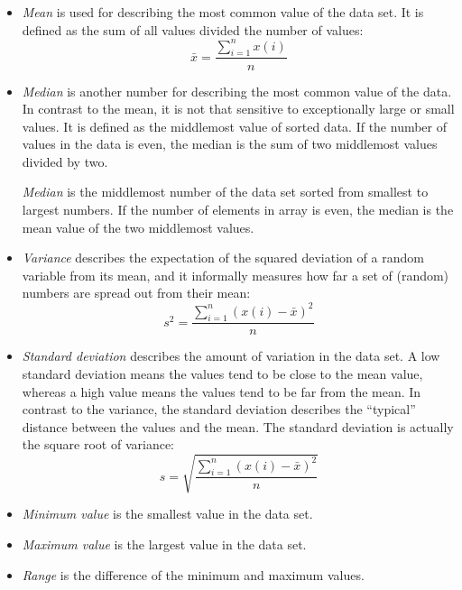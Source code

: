 \documentclass[english,12pt,a4paper,pdftex,elec,utf8]{aaltothesis}
\begin{document}
\begin{itemize}
\item \textit{Mean} is used for describing the most common value of the data set. It is defined as the sum of all values divided the number of values:
\begin{equation} \label{meanequation}
\bar{x} = \frac{\displaystyle \sum\limits^{n}_{i = 1} x(i)}{n}
\end{equation} 

\item \textit{Median} is another number for describing the most common value of the data. In contrast to the mean, it is not that sensitive to exceptionally large or small values. It is defined as the middlemost value of sorted data. If the number of values in the data is even, the median is the sum of two middlemost values divided by two.

\textit{Median} is the middlemost number of the data set sorted from smallest to largest numbers. If the number of elements in array is even, the median is the mean value of the two middlemost values.

\item \textit{Variance} describes the expectation of the squared deviation of a random variable from its mean, and it informally measures how far a set of (random) numbers are spread out from their mean:
\begin{equation} \label{varianceequation}
s^2 = \frac{ \sum\limits_{i = 1}^{n}(x(i) - \bar{x})^2}{n}
\end{equation} 

\item \textit{Standard deviation} describes the amount of variation in the data set. A low standard deviation means the values tend to be close to the mean value, whereas a high value means the values tend to be far from the mean. In contrast to the variance, the standard deviation describes the ``typical''  distance between the values and the mean. The standard deviation is actually the square root of variance:
\begin{equation} \label{standarddeviationequation}
s = \sqrt{\frac{ \sum\limits_{i = 1}^{n}(x(i) - \bar{x})^2}{n}}
\end{equation}

\item \textit{Minimum value} is the smallest value in the data set.

\item \textit{Maximum value} is the largest value in the data set.

\item \textit{Range} is the difference of the minimum and maximum values.
\end{itemize}
\end{document}
